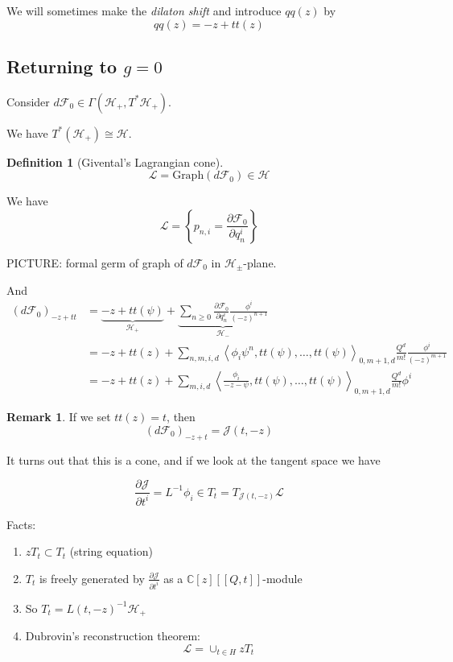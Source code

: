 \documentclass{amsart}
\theoremstyle{definition}
\newtheorem{remark}[dummy]{Remark}
\newtheorem{definition}[dummy]{Definition}
\newcommand{\J}{\mathcal{J}}
\newcommand{\C}{\mathbb{C}}
\begin{document}
We will sometimes make the \emph{dilaton shift} and introduce $qq(z)$ by
$$qq(z)=-z+tt(z)$$



\subsection{Returning to $g=0$}

Consider $d\mathcal{F}_0\in\Gamma(\mathcal{H}_+,T^*\mathcal{H}_+)$.

We have $T^*(\mathcal{H}_+)\cong \mathcal{H}$.

\begin{definition}[Givental's Lagrangian cone]
$$\mathcal{L}=\text{Graph}(d\mathcal{F}_0)\in\mathcal{H}$$
\end{definition}
We have
$$\mathcal{L}=\left\{p_{n,i}=\frac{\partial\mathcal{F}_0}{\partial q^i_n}\right\}$$

PICTURE: formal germ of graph of $d\mathcal{F}_0$ in $\mathcal{H}_\pm$-plane.

And
\begin{align*}
\left(d\mathcal{F}_0\right)_{-z+tt}&=\underbrace{-z+tt(\psi)}_{\mathcal{H}_+}+\underbrace{\sum_{n\geq 0} \frac{\partial\mathcal{F}_0}{\partial q^i_n}\frac{\phi^i}{(-z)^{n+1}}}_{\mathcal{H}_-}\\
&=-z+tt(z)+\sum_{n,m,i,d} \left\langle\phi_i\psi^n,tt(\psi),\dots,tt(\psi)\right\rangle_{0,m+1,d}\frac{Q^d}{m!}\frac{\phi^i}{(-z)^{m+1}} \\
&=-z+tt(z)+\sum_{m,i,d} \left\langle\frac{\phi_i}{-z-\psi},tt(\psi),\dots,tt(\psi)\right\rangle_{0,m+1,d}\frac{Q^d}{m!}\phi^i
\end{align*}

\begin{remark}
If we set $tt(z)=t$, then
$$\left( d\mathcal{F}_0\right)_{-z+t}=\J(t,-z)$$
\end{remark}
It turns out that this is a cone, and if we look at the tangent space we have

$$\frac{\partial\J}{\partial t^i}=L^{-1}\phi_i\in T_t=T_{\J(t,-z)}\mathcal{L}$$

Facts:

\begin{enumerate}
\item $zT_t\subset T_t$ (string equation)
\item $T_t$ is freely generated by $\frac{\partial\J}{\partial t^i}$ as a $\C[z][[Q,t]]$-module
\item So $T_t=L(t,-z)^{-1}\mathcal{H}_+$
\item Dubrovin's reconstruction theorem:
$$\mathcal{L}=\cup_{t\in H} zT_t$$
\end{enumerate}
\end{document}
